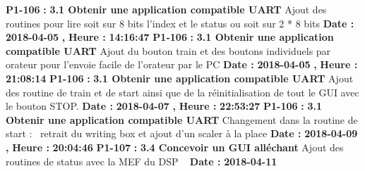 \documentclass{article}%
\begin{document}
%
\textbf{P1{-}106 }%
\textbf{ : }%
\textbf{ 3.1 Obtenir une application compatible UART}%
\newline%
\newline%
%
Ajout des routines pour lire soit sur 8 bits l'index et le status ou soit sur 2 * 8 bits\newline%
\newline%
%
\textbf{Date : }%
\textbf{2018{-}04{-}05}%
\textbf{,}%
\textbf{ Heure : }%
\textbf{14:16:47}%
\newline%
%
\textbf{P1{-}106 }%
\textbf{ : }%
\textbf{ 3.1 Obtenir une application compatible UART}%
\newline%
\newline%
%
Ajout du bouton train et des boutons individuels par orateur pour l'envoie facile de l'orateur par le PC\newline%
\newline%
%
\textbf{Date : }%
\textbf{2018{-}04{-}05}%
\textbf{,}%
\textbf{ Heure : }%
\textbf{21:08:14}%
\newline%
%
\textbf{P1{-}106 }%
\textbf{ : }%
\textbf{ 3.1 Obtenir une application compatible UART}%
\newline%
\newline%
%
Ajout des routine de train et de start ainsi que de la réinitialisation de tout le GUI avec le bouton STOP.\newline%
\newline%
%
\textbf{Date : }%
\textbf{2018{-}04{-}07}%
\textbf{,}%
\textbf{ Heure : }%
\textbf{22:53:27}%
\newline%
%
\textbf{P1{-}106 }%
\textbf{ : }%
\textbf{ 3.1 Obtenir une application compatible UART}%
\newline%
\newline%
%
Changement dans la routine de start :~\newline%
retrait du writing box et ajout d'un scaler à la place\newline%
\newline%
%
\textbf{Date : }%
\textbf{2018{-}04{-}09}%
\textbf{,}%
\textbf{ Heure : }%
\textbf{20:04:46}%
\newline%
%
\textbf{P1{-}107 }%
\textbf{ : }%
\textbf{ 3.4 Concevoir un GUI alléchant}%
\newline%
\newline%
%
Ajout des routines de status avec la MEF du DSP\newline%
~\newline%
\newline%
%
\textbf{Date : }%
\textbf{2018{-}04{-}11}%
\end{document}

